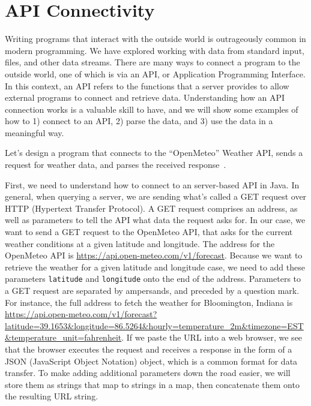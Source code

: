 \section{API Connectivity}
Writing programs that interact with the outside world is outrageously common in modern programming. 
We have explored working with data from standard input, files, and other data streams. 
There are many ways to connect a program to the outside world, one of which is via an API, or Application Programming Interface. 
In this context, an API refers to the functions that a server provides to allow external programs to connect and retrieve data. 
Understanding how an API connection works is a valuable skill to have, and we will show some examples of how to 1) connect to an API, 2) parse the data, and 3) use the data in a meaningful way.

Let's design a program that connects to the ``OpenMeteo'' Weather API, sends a request for weather data, and parses the received response~.

First, we need to understand how to connect to an server-based API in Java. 
In general, when querying a server, we are sending what's called a GET request over HTTP (Hypertext Transfer Protocol). 
A GET request comprises an address, as well as parameters to tell the API what data the request asks for. 
In our case, we want to send a GET request to the OpenMeteo API, that asks for the current weather conditions at a given latitude and longitude. 
The address for the OpenMeteo API is \url{https://api.open-meteo.com/v1/forecast}. 
Because we want to retrieve the weather for a given latitude and longitude case, we need to add these parameters \texttt{latitude} and \texttt{longitude} onto the end of the address. 
Parameters to a GET request are separated by ampersands, and preceded by a question mark. 
For instance, the full address to fetch the weather for Bloomington, Indiana is \url{https://api.open-meteo.com/v1/forecast?latitude=39.1653&longitude=86.5264&hourly=temperature\_2m&timezone=EST&temperature_unit=fahrenheit}. 
If we paste the URL into a web browser, we see that the browser executes the request and receives a response in the form of a JSON (JavaScript Object Notation) object, which is a common format for data transfer. 
To make adding additional parameters down the road easier, we will store them as strings that map to strings in a map, then concatenate them onto the resulting URL string.

